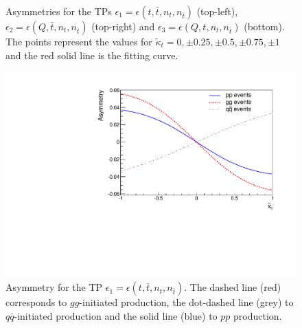 \documentclass[aps,preprint,tightenlines,floatfix,superscriptaddress,nofootinbib,showpacs]{revtex4-1}
\def\tbar{\bar{t}}
\def\qbar{\bar{q}}
\def\kpt{\tilde{\kappa}_t}
\begin{document}
\begin{center}
\begin{figure}[H]
\caption{Asymmetries for the TPs
  $\epsilon_1=\epsilon(t,\tbar,n_t,n_{\tbar})$ (top-left),
  $\epsilon_2=\epsilon(Q,\tbar,n_t,n_{\tbar})$ (top-right) and
  $\epsilon_3=\epsilon(Q,t,n_t,n_{\tbar})$ (bottom). The points
  represent the values for $\kpt=0,\pm 0.25, \pm 0.5, \pm 0.75,\pm 1$
  and the red solid line is the fitting curve.}
\label{fig3}
\end{figure}
\end{center}
%
\begin{center}
\vspace*{-4mm}
\begin{figure}[H]
\centering
\includegraphics[scale=0.45]{ATP1juntos_nuevo.pdf}
\caption{Asymmetry for the TP
  $\epsilon_1=\epsilon(t,\tbar,n_t,n_{\tbar})$. The dashed line (red)
  corresponds to $gg$-initiated production, the dot-dashed line (grey)
  to $q\qbar$-initiated production and the solid line (blue) to $pp$
  production.}
\label{fig4}
\end{figure}
\end{center}
\vspace*{-6mm}
\end{document}
